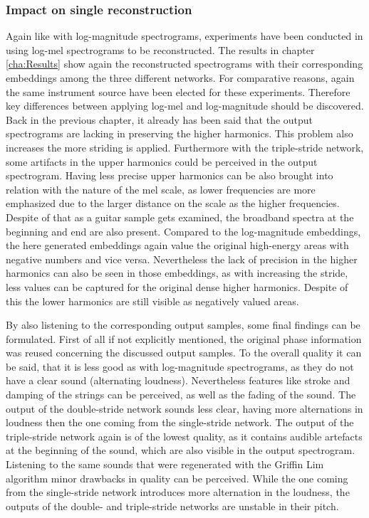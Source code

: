 \subsubsection{Impact on single reconstruction}
Again like with log-magnitude spectrograms, experiments have been conducted in using log-mel spectrograms to be reconstructed. The results in chapter \ref{cha:Results} show again the reconstructed spectrograms with their corresponding embeddings among the three different networks. For comparative reasons, again the same instrument source have been elected for these experiments. Therefore key differences between applying log-mel and log-magnitude should be discovered. Back in the previous chapter, it already has been said that the output spectrograms are lacking in preserving the higher harmonics. This problem also increases the more striding is applied. Furthermore with the triple-stride network, some artifacts in the upper harmonics could be perceived in the output spectrogram. Having less precise upper harmonics can be also brought into relation with the nature of the mel scale, as lower frequencies are more emphasized due to the larger distance on the scale as the higher frequencies. Despite of that as a guitar sample gets examined, the broadband spectra at the beginning and end are also present. Compared to the log-magnitude embeddings, the here generated embeddings again value the original high-energy areas with negative numbers and vice versa. Nevertheless the lack of precision in the higher harmonics can also be seen in those embeddings, as with increasing the stride, less values can be captured for the original dense higher harmonics. Despite of this the lower harmonics are still visible as negatively valued areas. 

By also listening to the corresponding output samples, some final findings can be formulated. First of all if not explicitly mentioned, the original phase information was reused concerning the discussed output samples. To the overall quality it can be said, that it is less good as with log-magnitude spectrograms, as they do not have a clear sound (alternating loudness). Nevertheless features like stroke and damping of the strings can be perceived, as well as the fading of the sound. The output of the double-stride network sounds less clear, having more alternations in loudness then the one coming from the single-stride network. The output of the triple-stride network again is of the lowest quality, as it contains audible artefacts at the beginning of the sound, which are also visible in the output spectrogram. Listening to the same sounds that were regenerated with the Griffin Lim algorithm minor drawbacks in quality can be perceived. While the one coming from the single-stride network introduces more alternation in the loudness, the outputs of the double- and triple-stride networks are unstable in their pitch. 

